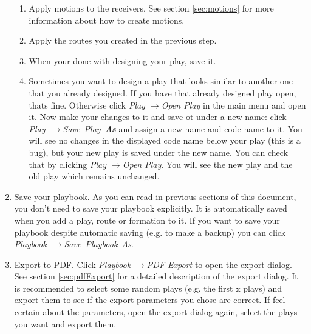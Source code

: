\documentclass[10pt,a4paper]{article}
\newcommand{\pfeil}{$\rightarrow$}
\begin{document}
\begin{enumerate}
\begin{enumerate}
					\item Apply motions to the receivers. See section \ref{sec:motions} for more information about how to create motions.
					
					\item Apply the routes you created in the previous step.
					
					\item When your done with designing your play, save it.
					
					\item Sometimes you want to design a play that looks similar to another one that you already designed. If you have that already designed play open, thats fine. Otherwise click \textit{Play \pfeil Open Play} in the main menu and open it. Now make your changes to it and save ot under a new name: click \mbox{\textit{Play \pfeil Save Play \textbf{As}}} and assign a new name and code name to it. You will see no changes in the displayed code name below your play (this is a bug), but your new play is saved under the new name. You can check that by clicking \textit{Play \pfeil Open Play}. You will see the new play and the old play which remains unchanged.
				\end{enumerate}
				
			\item Save your playbook. As you can read in previous sections of this document, you don't need to save your playbook explicitly. It is automatically saved when you add a play, route or formation to it. If you want to save your playbook despite automatic saving (e.g. to make a backup) you can click \mbox{\textit{Playbook \pfeil Save Playbook As}}.
			
			\item Export to PDF. Click \textit{Playbook \pfeil PDF Export} to open the export dialog. See section \ref{sec:pdfExport} for a detailed description of the export dialog. It is recommended to select some random plays (e.g. the first x plays) and export them to see if the export parameters you chose are correct. If feel certain about the parameters, open the export dialog again, select the plays you want and export them.
		\end{enumerate}
\end{document}
